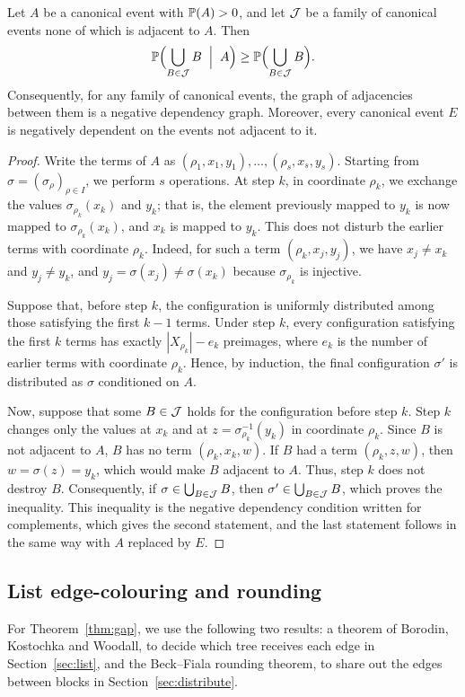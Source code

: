 \begin{lemma}\label{lem:negdep}
Let $A$ be a canonical event with $\mathbb{P}(A)>0$, and let $\mathcal{J}$ be a family of canonical events none of which is adjacent to $A$. Then
\[\mathbb{P}\Bigl(\bigcup_{B\in\mathcal{J}}B\;\Bigm|\;A\Bigr)\ge\mathbb{P}\Bigl(\bigcup_{B\in\mathcal{J}}B\Bigr).\]
Consequently, for any family of canonical events, the graph of adjacencies between them is a negative dependency graph. Moreover, every canonical event $E$ is negatively dependent on the events not adjacent to it.
\end{lemma}
\begin{proof}
Write the terms of $A$ as $(\rho_1,x_1,y_1),\dots,(\rho_s,x_s,y_s)$. Starting from $\sigma=(\sigma_\rho)_{\rho\in I}$, we perform $s$ operations. At step $k$, in coordinate $\rho_k$, we exchange the values $\sigma_{\rho_k}(x_k)$ and $y_k$; that is, the element previously mapped to $y_k$ is now mapped to $\sigma_{\rho_k}(x_k)$, and $x_k$ is mapped to $y_k$.
This does not disturb the earlier terms with coordinate $\rho_k$. Indeed, for such a term $(\rho_k,x_j,y_j)$, we have $x_j\neq x_k$ and $y_j\ne y_k$, and $y_j=\sigma(x_j)\neq\sigma(x_k)$ because $\sigma_{\rho_k}$ is injective.

Suppose that, before step $k$, the configuration is uniformly distributed among those satisfying the first $k-1$ terms. Under step $k$, every configuration satisfying the first $k$ terms has exactly $|X_{\rho_k}|-e_k$ preimages, where $e_k$ is the number of earlier terms with coordinate $\rho_k$. Hence, by induction, the final configuration $\sigma'$ is distributed as $\sigma$ conditioned on $A$.

Now, suppose that some $B\in\mathcal{J}$ holds for the configuration before step $k$. Step $k$ changes only the values at $x_k$ and at $z=\sigma_{\rho_k}^{-1}(y_k)$ in coordinate $\rho_k$. Since $B$ is not adjacent to $A$, $B$ has no term $(\rho_k,x_k,w)$. If $B$ had a term $(\rho_k,z,w)$, then $w=\sigma(z)=y_k$, which would make $B$ adjacent to $A$. Thus, step $k$ does not destroy $B$. Consequently, if $\sigma\in\bigcup_{B\in\mathcal{J}}B$, then $\sigma'\in\bigcup_{B\in\mathcal{J}}B$, which proves the inequality.
This inequality is the negative dependency condition written for complements, which gives the second statement, and the last statement follows in the same way with $A$ replaced by $E$.
\end{proof}

\subsection{List edge-colouring and rounding}\label{sec:listrounding}
For Theorem~\ref{thm:gap}, we use the following two results: a theorem of Borodin, Kostochka and Woodall, to decide which tree receives each edge in Section~\ref{sec:list}, and the Beck--Fiala rounding theorem, to share out the edges between blocks in Section~\ref{sec:distribute}.

